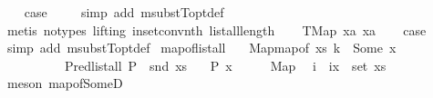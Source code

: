\begin{isabellebody}
\ \ \isamarkupfalse%
\ {\isacharquery}{\kern0pt}case\ \isanewline
\ \ \isamarkupfalse%
\ {\isacharparenleft}{\kern0pt}simp\ add{\isacharcolon}{\kern0pt}\ msubstT{\isacharunderscore}{\kern0pt}opt{\isacharunderscore}{\kern0pt}def{\isacharparenright}{\kern0pt}\isanewline
\ \ \isamarkupfalse%
\ {\isacharparenleft}{\kern0pt}metis\ {\isacharparenleft}{\kern0pt}no{\isacharunderscore}{\kern0pt}types{\isacharcomma}{\kern0pt}\ lifting{\isacharparenright}{\kern0pt}\ in{\isacharunderscore}{\kern0pt}set{\isacharunderscore}{\kern0pt}conv{\isacharunderscore}{\kern0pt}nth\ list{\isacharunderscore}{\kern0pt}all{\isacharunderscore}{\kern0pt}length{\isacharparenright}{\kern0pt}\isanewline
{}\isamarkupfalse%
\isanewline
\ \ \isamarkupfalse%
\ {\isacharparenleft}{\kern0pt}TMap\ x{}a\ x{}a{\isacharparenright}{\kern0pt}\isanewline
\ \ \isamarkupfalse%
\ {\isacharquery}{\kern0pt}case\ \isamarkupfalse%
\ {\isacharparenleft}{\kern0pt}simp\ add{\isacharcolon}{\kern0pt}\ msubstT{\isacharunderscore}{\kern0pt}opt{\isacharunderscore}{\kern0pt}def{\isacharparenright}{\kern0pt}\isanewline
{}\isamarkupfalse%
%
\endisatagproof
{\isafoldproof}%
%
\isadelimproof
\isanewline
%
\endisadelimproof
\isanewline
{}\isamarkupfalse%
\ map{\isacharunderscore}{\kern0pt}of{\isacharunderscore}{\kern0pt}list{\isacharunderscore}{\kern0pt}all{\isacharcolon}{\kern0pt}\isanewline
\ \ \ Map{\isacharcolon}{\kern0pt}{\isachardoublequoteopen}map{\isacharunderscore}{\kern0pt}of\ xs\ k\ {\isacharequal}{\kern0pt}\ Some\ x{\isachardoublequoteclose}\ \isanewline
\ \ \ \ \ \ \ \ \ \ Pred{\isacharcolon}{\kern0pt}{\isachardoublequoteopen}list{\isacharunderscore}{\kern0pt}all\ {\isacharparenleft}{\kern0pt}P\ {\isasymcirc}\ snd{\isacharparenright}{\kern0pt}\ xs{\isachardoublequoteclose}\isanewline
\ \ \ {\isachardoublequoteopen}P\ x{\isachardoublequoteclose}\isanewline
%
\isadelimproof
%
\endisadelimproof
%
\isatagproof
{}\isamarkupfalse%
\ {\isacharminus}{\kern0pt}\isanewline
\ \ \isamarkupfalse%
\ Map\ \isamarkupfalse%
\ i\ \ {\isachardoublequoteopen}{\isacharparenleft}{\kern0pt}i{\isacharcomma}{\kern0pt}x{\isacharparenright}{\kern0pt}\ {\isasymin}\ set\ xs{\isachardoublequoteclose}\isanewline
\ \ \ \ \isamarkupfalse%
\ {\isacharparenleft}{\kern0pt}meson\ map{\isacharunderscore}{\kern0pt}of{\isacharunderscore}{\kern0pt}SomeD{\isacharparenright}{\kern0pt}\ \isanewline

\end{isabellebody}
